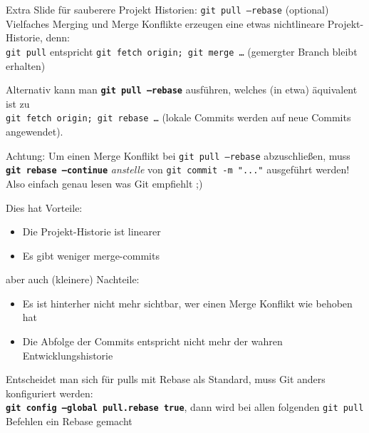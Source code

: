 \begin{frame}{Extra Slide für sauberere Projekt Historien: \texttt{git pull --rebase} (optional)}
    Vielfaches Merging und Merge Konflikte erzeugen eine etwas nichtlineare Projekt-Historie, denn:\\
    \texttt{git pull} entspricht \texttt{git fetch origin; git merge …} (\to\;gemergter Branch bleibt erhalten)

    Alternativ kann man \texttt{\textbf{git pull --rebase}} ausführen, welches (in etwa) äquivalent ist zu\\\texttt{git fetch origin; git rebase …} (\to\;lokale Commits werden auf neue Commits angewendet).

    {\color{red} Achtung: Um einen Merge Konflikt bei \texttt{git pull --rebase} abzuschließen, muss \texttt{\textbf{git~rebase~--continue}} \emph{anstelle} von \texttt{git commit -m "..."} ausgeführt werden! Also einfach genau lesen was Git empfiehlt ;)}

    Dies hat Vorteile:
    \begin{itemize}
        \item Die Projekt-Historie ist linearer
        \item Es gibt weniger merge-commits
    \end{itemize}
    aber auch (kleinere) Nachteile:
    \begin{itemize}
        \item Es ist hinterher nicht mehr sichtbar, wer einen Merge Konflikt wie behoben hat
        \item Die Abfolge der Commits entspricht nicht mehr der wahren Entwicklungshistorie
    \end{itemize}
    Entscheidet man sich für pulls mit Rebase als Standard, muss Git anders konfiguriert werden:\\
    \texttt{\textbf{git config --global pull.rebase true}}, dann wird bei allen folgenden \texttt{git pull} Befehlen ein Rebase gemacht
\end{frame}
